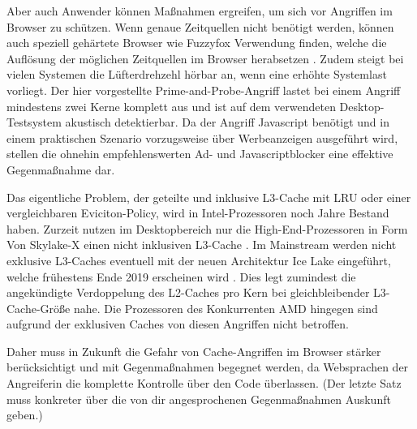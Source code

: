 Aber auch Anwender können Maßnahmen ergreifen, um sich vor Angriffen im Browser zu schützen.
Wenn genaue Zeitquellen nicht benötigt werden, können auch speziell gehärtete Browser wie Fuzzyfox \cite{Fuzzyfox} Verwendung finden, welche die Auflösung der möglichen Zeitquellen im Browser herabsetzen \cite{FantasticTimers}.
Zudem steigt bei vielen Systemen die Lüfterdrehzehl hörbar an, wenn eine erhöhte Systemlast vorliegt. 
Der hier vorgestellte Prime-and-Probe-Angriff lastet bei einem Angriff mindestens zwei Kerne komplett aus und ist auf dem verwendeten Desktop-Testsystem akustisch detektierbar.
Da der Angriff Javascript benötigt und in einem praktischen Szenario vorzugsweise über Werbeanzeigen ausgeführt wird, stellen die ohnehin empfehlenswerten Ad- und Javascriptblocker eine effektive Gegenmaßnahme dar.

Das eigentliche Problem, der geteilte und inklusive L3-Cache mit LRU oder einer vergleichbaren Eviciton-Policy, wird in Intel-Prozessoren noch Jahre Bestand haben.
Zurzeit nutzen im Desktopbereich nur die High-End-Prozessoren in Form Von Skylake-X einen nicht inklusiven L3-Cache \cite{SkylakeXL3Cache}.
Im Mainstream werden nicht exklusive L3-Caches eventuell mit der neuen Architektur Ice Lake eingeführt, welche frühestens Ende 2019 erscheinen wird \cite{IceLakeReleaseDate}.
Dies legt zumindest die angekündigte Verdoppelung des L2-Caches pro Kern bei gleichbleibender L3-Cache-Größe nahe.
Die Prozessoren des Konkurrenten AMD hingegen sind aufgrund der exklusiven Caches \cite{CacheRyzen} von diesen Angriffen nicht betroffen.

Daher muss in Zukunft die Gefahr von Cache-Angriffen im Browser stärker berücksichtigt und mit Gegenmaßnahmen begegnet werden, da Websprachen der Angreiferin die komplette Kontrolle über den Code überlassen. (Der letzte Satz muss konkreter über die von dir angesprochenen Gegenmaßnahmen Auskunft geben.)




